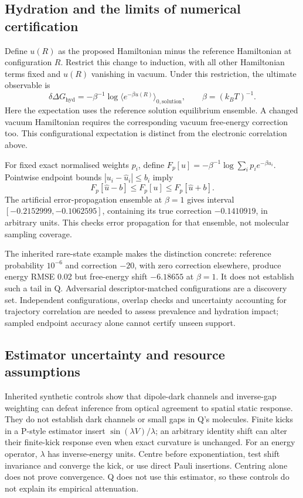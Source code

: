 \documentclass{article}
\begin{document}
\subsection{Hydration and the limits of numerical certification}

Define $u(R)$ as the proposed Hamiltonian minus the reference Hamiltonian at configuration $R$. Restrict this change to induction, with all other Hamiltonian terms fixed and $u(R)$ vanishing in vacuum. Under this restriction, the ultimate observable is
\begin{equation*}
\delta\Delta G_{\mathrm{hyd}}=-\beta^{-1}\log\langle e^{-\beta u(R)}\rangle_{0,\mathrm{solution}},\qquad \beta=(k_BT)^{-1}.
\end{equation*}
Here the expectation uses the reference solution equilibrium ensemble. A changed vacuum Hamiltonian requires the corresponding vacuum free-energy correction too. This configurational expectation is distinct from the electronic correlation above.

For fixed exact normalised weights $p_i$, define $F_p[u]=-\beta^{-1}\log\sum_i p_i e^{-\beta u_i}$. Pointwise endpoint bounds $|u_i-\widehat u_i|\le b_i$ imply
\begin{equation*}
F_p[\widehat u-b]\le F_p[u]\le F_p[\widehat u+b].
\end{equation*}
The artificial error-propagation ensemble at $\beta=1$ gives interval $[-0.2152999,-0.1062595]$, containing its true correction $-0.1410919$, in arbitrary units. This checks error propagation for that ensemble, not molecular sampling coverage.

The inherited rare-state example makes the distinction concrete: reference probability $10^{-6}$ and correction $-20$, with zero correction elsewhere, produce energy RMSE 0.02 but free-energy shift $-6.18655$ at $\beta=1$. It does not establish such a tail in Q. Adversarial descriptor-matched configurations are a discovery set. Independent configurations, overlap checks and uncertainty accounting for trajectory correlation are needed to assess prevalence and hydration impact; sampled endpoint accuracy alone cannot certify unseen support.

\subsection{Estimator uncertainty and resource assumptions}

Inherited synthetic controls show that dipole-dark channels and inverse-gap weighting can defeat inference from optical agreement to spatial static response. They do not establish dark channels or small gaps in Q's molecules. Finite kicks in a P-style estimator insert $\sin(\lambda V)/\lambda$; an arbitrary identity shift can alter their finite-kick response even when exact curvature is unchanged. For an energy operator, $\lambda$ has inverse-energy units. Centre before exponentiation, test shift invariance and converge the kick, or use direct Pauli insertions. Centring alone does not prove convergence. Q does not use this estimator, so these controls do not explain its empirical attenuation.
\end{document}
